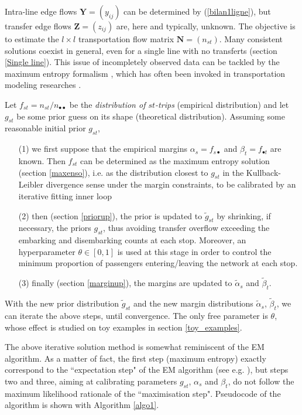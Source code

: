 \documentclass{bmcart}
\begin{document}
Intra-line edge flows $\mathbf{Y}=(y_{ij})$ can be determined by (\ref{bilan1ligne}), but transfer edge flows $\mathbf{Z}=(z_{ij})$ are, here and typically, unknown. The objective is to estimate the $l\times l$ transportation flow matrix $\mathbf{N}=(n_{st})$. Many consistent solutions coexist in general, even for a single line with no transferts (section \ref{Single line}). This issue of incompletely observed data can be tackled by the maximum entropy formalism \cite{jaynes1957information}, which has often been invoked in transportation modeling researches \cite{wilson1967statistical}  \cite{erlander1990gravity}. 

Let $f_{st}=n_{st}/n_{\bullet\bullet}$ be the \emph{distribution of $st$-trips} (empirical distribution) and let $g_{st}$ be some prior guess on its shape (theoretical distribution). 
Assuming some reasonable initial prior $g_{st}$, 
\begin{itemize}
\item[(1)] we first suppose that the empirical margins $\alpha_s=f_{s\bullet}$ and $\beta_t=f_{\bullet t}$ are known.  
Then $f_{st}$ can be determined as the maximum entropy solution (section \ref{maxenso}), i.e. as the distribution closest to $g_{st}$ in the Kullback-Leibler divergence sense under the margin constraints, to be calibrated by an iterative fitting inner loop
\item[(2)] then (section \ref{priorup}), the prior is updated to $\tilde{g}_{st}$ by shrinking, if necessary, the priors $g_{st}$, thus avoiding transfer overflow exceeding the embarking and disembarking counts at each stop. Moreover, an hyperparameter $\theta \in [0, 1]$ is used at this stage in order to control the minimum proportion of passengers entering/leaving the network at each stop.
\item[(3)] finally (section \ref{marginup}), the margins are updated to $\tilde{\alpha}_s$ and $\tilde{\beta}_t$.
\end{itemize}
With the new prior distribution $\widetilde{g}_{st}$ and the new margin distributions $\widetilde{\alpha}_s$, $\widetilde{\beta}_t$, we can iterate the above steps, until convergence. The only free parameter is $\theta$, whose effect is studied on toy examples in section \ref{toy_examples}.
 
The above iterative solution method is somewhat reminiscent of the EM algorithm. As a matter of fact, the first  step  (maximum entropy) exactly correspond to the ``expectation step" of the EM algorithm (see e.g. \cite{dempster1977maximum}  \cite{bavaud2009information}), but steps two and three, aiming at calibrating parameters $g_{st}$, $\alpha_s$ and $\beta_t$, do not follow the maximum likelihood rationale of the ``maximisation step". Pseudocode of the algorithm is shown with Algorithm \ref{algo1}.
\end{document}

